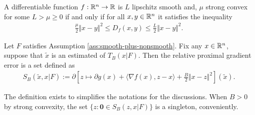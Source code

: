 \documentclass[12pt]{article}
\begin{document}
        \begin{definition}\label{def:lip-smooth-and-scnvx}
            A differentiable function $f: \mathbb R^n \rightarrow \mathbb R$ is $L$ lipschitz smooth and, $\mu$ strong convex for some $L > \mu \ge 0$ if and only if for all $x, y \in \mathbb R^n$ it satisfies the inequality 
            \begin{align*}
                \frac{\mu}{2}\Vert x - y\Vert^2 \le D_f(x, y) \le \frac{L}{2}\Vert x - y\Vert^2. 
            \end{align*}
        \end{definition}
        \begin{definition}\label{def:pg-err-ruler}
            Let $F$ satisfies Assumption \ref{ass:smooth-plus-nonsmooth}. 
            Fix any $x \in \mathbb R^n$, suppose that $\tilde x$ is an estimated of $T_B(x|F)$. 
            Then the relative proximal gradient error is a set defined as
            \begin{align*}
                S_B(\tilde x, x | F) := 
                \partial \left[
                    z \mapsto \partial g(x) + \langle \nabla f(x), z - x\rangle + 
                    \frac{B}{2}\Vert x - z\Vert^2
                \right](\tilde x). 
            \end{align*}
        \end{definition}
        \begin{remark}
            The definition exists to simplifies the notations for the discussions. 
            When $B > 0$ by strong convexity, the set $\{z : \mathbf 0 \in S_B(z, x | F)\}$ is a singleton, conveniently. 
        \end{remark}
\end{document}
